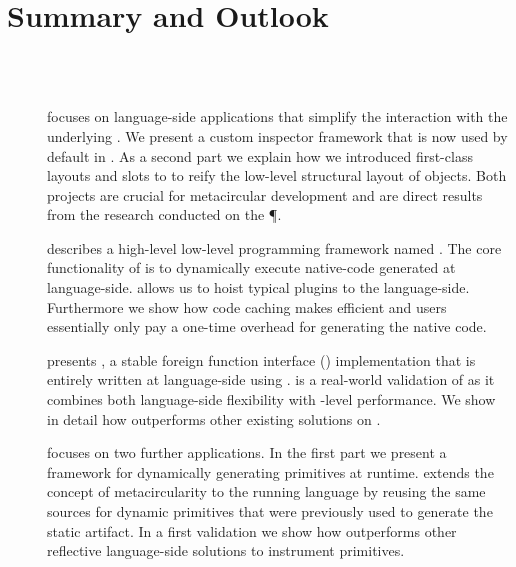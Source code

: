 \section{Summary and Outlook}

 \\
\\
\begin{description}	
	\item[] focuses on language-side applications that simplify the interaction with the underlying \VM.
	We present a custom inspector framework that is now used by default in \PH.
	As a second part we explain how we introduced first-class layouts and slots to \PH to reify the low-level structural layout of objects.
	Both projects are crucial for metacircular \VM development and are direct results from the research conducted on the \P \VM.
	
	\item[] describes a high-level low-level programming framework named \B.
	The core functionality of \B is to dynamically execute native-code generated at language-side.
	\B allows us to hoist typical \VM plugins to the language-side.
	Furthermore we show how code caching makes \B efficient and users essentially only pay a one-time overhead for generating the native code.
		
	\item[] presents \NB, a stable foreign function interface (\FFI) implementation that is entirely written at language-side using \B.
	\NB is a real-world validation of \B as it combines both language-side flexibility with \VM-level performance.
	We show in detail how \NB outperforms other existing \FFI solutions on \PH.
	
	\item[] focuses on two further \B applications.
	In the first part we present \WF a framework for dynamically generating primitives at runtime.
	\WF extends the concept of metacircularity to the running language by reusing the same sources for dynamic primitives that were previously used to generate the static \VM artifact.
	In a first validation we show how \WF outperforms other reflective language-side solutions to instrument primitives.
		

\end{description}
